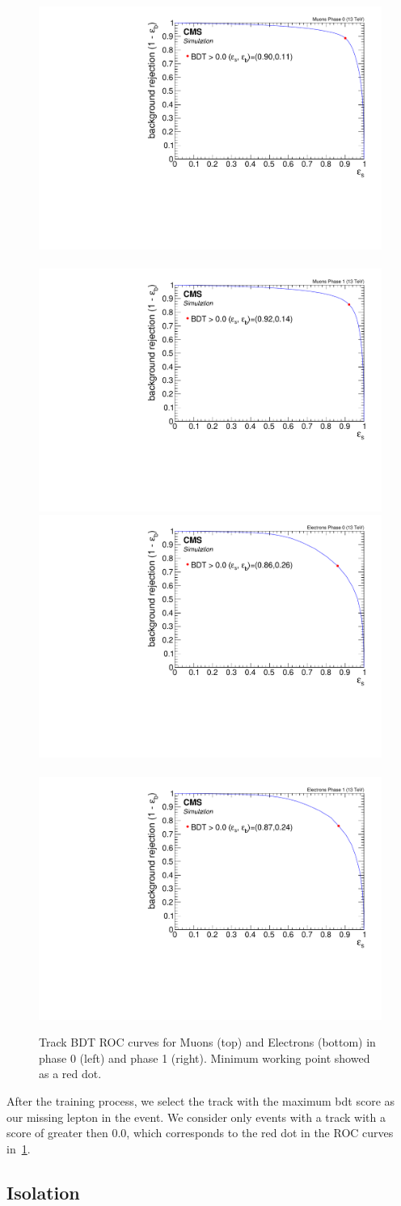 \begin{figure}[!htb]
\centering
\includegraphics[width=0.48\linewidth]{plots/track_bdt/roc_Tracks_Muons_Phase_0.pdf} \,
\includegraphics[width=0.48\linewidth]{plots/track_bdt/roc_Tracks_Muons_Phase_1.pdf}  \\
\includegraphics[width=0.48\linewidth]{plots/track_bdt/roc_Tracks_Electrons_Phase_0.pdf} \,
\includegraphics[width=0.48\linewidth]{plots/track_bdt/roc_Tracks_Electrons_Phase_1.pdf} \\
\caption[Track BDT ROC curves]{Track BDT ROC curves for Muons (top) and Electrons (bottom) in phase 0 (left) and phase 1 (right). Minimum working point showed as a red dot.}
\label{fig:track-bdt-roc}
\end{figure}

After the training process, we select the track with the maximum \gls{bdt} score as our missing lepton in the event. We consider only events with a track with a score of greater then 0.0, which corresponds to the red dot in the ROC curves in~\ref{fig:track-bdt-roc}.

\clearpage
\subsection{Isolation}
\label{sec:isolation}
